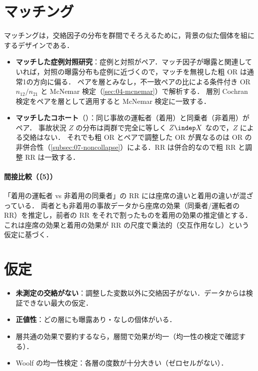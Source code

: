 \section{マッチング}\label{sec:07-match}
\Hinshutsu マッチングは，交絡因子の分布を群間でそろえるために，背景の似た個体を組にするデザインである．
\begin{itemize}
\item \textbf{マッチした症例対照研究}：症例と対照がペア．マッチ因子が曝露と関連していれば，対照の曝露分布も症例に近づくので，マッチを無視した粗 OR は通常1の方向に偏る．
      ペアを層とみなし，不一致ペアの比による条件付き OR $n_{12}/n_{21}$ と McNemar 検定（\cref{sec:04-mcnemar}）で解析する．
      層別 Cochran 検定をペアを層として適用すると McNemar 検定に一致する．
\item \textbf{マッチしたコホート}（）：同じ事故の運転者（着用）と同乗者（非着用）がペア．
      事故状況 $Z$ の分布は両群で完全に等しく $Z\indep X$ なので，$Z$ による交絡はない．
      それでも粗 OR とペアで調整した OR が異なるのは OR の非併合性（\cref{subsec:07-noncollapse}）による．RR は併合的なので粗 RR と調整 RR は一致する．
\end{itemize}
\paragraph{間接比較（〔5〕）}
「着用の運転者 vs 非着用の同乗者」の RR には座席の違いと着用の違いが混ざっている．
両者とも非着用の事故データから座席の効果（同乗者/運転者の RR）を推定し，前者の RR をそれで割ったものを着用の効果の推定値とする．
これは座席の効果と着用の効果が RR の尺度で乗法的（交互作用なし）という仮定に基づく．

\section{仮定}\label{sec:07-assump}
\begin{itemize}
\item \textbf{未測定の交絡がない}：調整した変数以外に交絡因子がない．データからは検証できない最大の仮定．
\item \textbf{正値性}：どの層にも曝露あり・なしの個体がいる．
\item 層共通の効果で要約するなら，層間で効果が均一（均一性の検定で確認する）．
\item Woolf の均一性検定：各層の度数が十分大きい（ゼロセルがない）．
\end{itemize}

